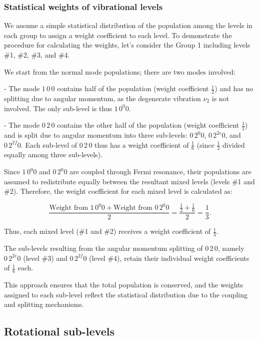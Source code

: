 \subsubsection{Statistical weights of vibrational levels}

We assume a simple statistical distribution of the population among the levels in each group to assign a weight coefficient to each level. To demonstrate the procedure for calculating the weights, let's consider the Group 1 including levels \#1, \#2, \#3, and \#4.

We start from the normal mode populations; there are two modes involved:

- The mode $1\,0\,0$ contains half of the population (weight coefficient $\frac{1}{2}$) and has no splitting due to angular momentum, as the degenerate vibration $\nu_2$ is not involved. The only sub-level is thus $1\,0^{0}0$.

- The mode $0\,2\,0$ contains the other half of the population (weight coefficient $\frac{1}{2}$) and is split due to angular momentum into three sub-levels: $0\,2^{0}0$, $0\,2^{2e}0$, and $0\,2^{2f}0$. Each sub-level of $0\,2\,0$ thus has a weight coefficient of $\frac{1}{6}$ (since $\frac{1}{2}$ divided equally among three sub-levels).

Since $1\,0^{0}0$ and $0\,2^{0}0$ are coupled through Fermi resonance, their populations are assumed to redistribute equally between the resultant mixed levels (levels \#1 and \#2). Therefore, the weight coefficient for each mixed level is calculated as:

\[
\frac{ \text{Weight from } 1\,0^{0}0 + \text{Weight from } 0\,2^{0}0 }{2} = \frac{ \frac{1}{2} + \frac{1}{6} }{2} = \frac{1}{3}.
\]

Thus, each mixed level (\#1 and \#2) receives a weight coefficient of $\frac{1}{3}$.

The sub-levels resulting from the angular momentum splitting of $0\,2\,0$, namely $0\,2^{2e}0$ (level \#3) and $0\,2^{2f}0$ (level \#4), retain their individual weight coefficients of $\frac{1}{6}$ each.

This approach ensures that the total population is conserved, and the weights assigned to each sub-level reflect the statistical distribution due to the coupling and splitting mechanisms.







\subsection{Rotational sub-levels}

